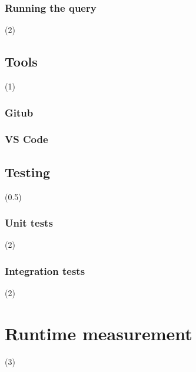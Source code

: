 \subsection{Running the query}

(2)

\section{Tools}

(1)

\subsection{Gitub}

\subsection{VS Code}

\section{Testing}

(0.5)

\subsection{Unit tests}

(2)

\subsection{Integration tests}

(2)

\chapter{Runtime measurement}
\label{appx:simulation}

(3)
